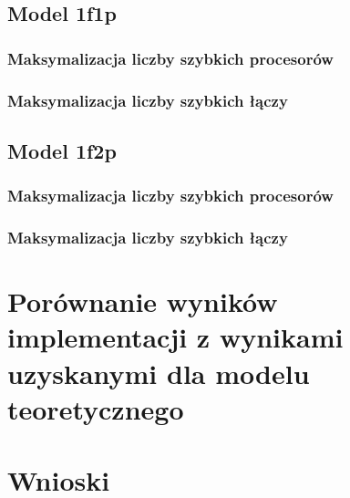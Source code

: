 \documentclass[a4paper,11pt, titlepage]{article}
\begin{document}
\subsection{Model 1f1p}
\subsubsection{Maksymalizacja liczby szybkich procesorów}
\subsubsection{Maksymalizacja liczby szybkich łączy}
\subsection{Model 1f2p}
\subsubsection{Maksymalizacja liczby szybkich procesorów}
\subsubsection{Maksymalizacja liczby szybkich łączy}
\section{Porównanie wyników implementacji z wynikami uzyskanymi dla modelu teoretycznego}
\section{Wnioski}
\end{document}
